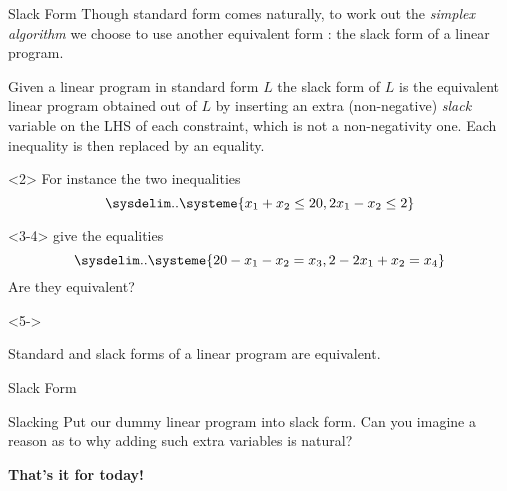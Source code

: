 \documentclass[32pt, aspectratio = 169]{beamer}
\begin{document}
\begin{frame}{Slack Form}
  Though standard form comes naturally, to work out the \emph{simplex
    algorithm} we choose to use another equivalent form : the slack
  form of a linear program.
  \begin{defn}
    Given a linear program in standard form $L$ the slack form of $L$
    is the equivalent linear program obtained out of $L$ by inserting
    an extra (non-negative) \emph{slack} variable on the LHS of each
    constraint, which is not a non-negativity one. Each inequality is
    then replaced by an equality.
  \end{defn}
  \vspace{1em}
  \begin{overlayarea}{\textwidth}{.35\textheight}
    \begin{onlyenv}<2>
      For instance the two inequalities
      \[
      \sysdelim..\systeme{x_1 + x_2 \leq 20, 2x_1 - x_2 \leq 2}
      \]
    \end{onlyenv}
    \begin{onlyenv}<3-4>
      give the equalities
      \[
      \sysdelim..\systeme{20 - x_1 - x_2 = x_3, 2 - 2x_1 + x_2 = x_4 }
      \]
      \pause[4] Are they equivalent?
    \end{onlyenv}
    \begin{onlyenv}<5->
      \vspace{-\baselineskip}
      \begin{prop}
        Standard and slack forms of a linear program are equivalent.
      \end{prop}
    \end{onlyenv}
  \end{overlayarea}
\end{frame}

\begin{frame}{Slack Form}
  \begin{halfshyblock}{Slacking}
    Put our dummy linear program into slack form. Can you imagine a
    reason as to why adding such extra variables is natural?
  \end{halfshyblock}
\end{frame}

\begin{frame}
  \begin{center}
    {\huge \textbf{That's it for today!}}
   \end{center}
 \end{frame}

\end{document}
